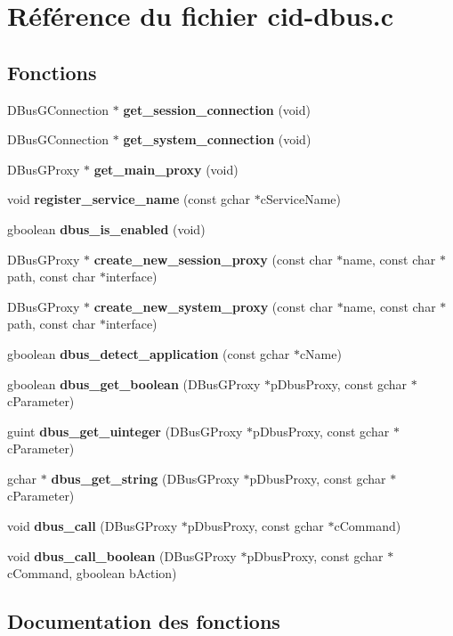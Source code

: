 \section{Référence du fichier cid-dbus.c}
\label{cid-dbus_8c}
\subsection*{Fonctions}
\begin{CompactItemize}
\item 
DBusGConnection $\ast$ {\bf get\_\-session\_\-connection} (void)
\item 
DBusGConnection $\ast$ {\bf get\_\-system\_\-connection} (void)
\item 
DBusGProxy $\ast$ {\bf get\_\-main\_\-proxy} (void)
\item 
void {\bf register\_\-service\_\-name} (const gchar $\ast$cServiceName)
\item 
gboolean {\bf dbus\_\-is\_\-enabled} (void)
\item 
DBusGProxy $\ast$ {\bf create\_\-new\_\-session\_\-proxy} (const char $\ast$name, const char $\ast$path, const char $\ast$interface)
\item 
DBusGProxy $\ast$ {\bf create\_\-new\_\-system\_\-proxy} (const char $\ast$name, const char $\ast$path, const char $\ast$interface)
\item 
gboolean {\bf dbus\_\-detect\_\-application} (const gchar $\ast$cName)
\item 
gboolean {\bf dbus\_\-get\_\-boolean} (DBusGProxy $\ast$pDbusProxy, const gchar $\ast$cParameter)
\item 
guint {\bf dbus\_\-get\_\-uinteger} (DBusGProxy $\ast$pDbusProxy, const gchar $\ast$cParameter)
\item 
gchar $\ast$ {\bf dbus\_\-get\_\-string} (DBusGProxy $\ast$pDbusProxy, const gchar $\ast$cParameter)
\item 
void {\bf dbus\_\-call} (DBusGProxy $\ast$pDbusProxy, const gchar $\ast$cCommand)
\item 
void {\bf dbus\_\-call\_\-boolean} (DBusGProxy $\ast$pDbusProxy, const gchar $\ast$cCommand, gboolean bAction)
\end{CompactItemize}


\subsection{Documentation des fonctions}
